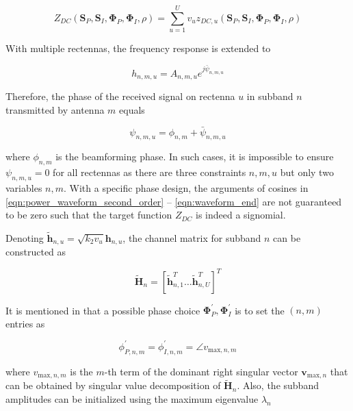 \begin{equation}\label{eqn:weighted_target}
  {Z_{DC}}\left( {{{\mathbf{S}}_P},{{\mathbf{S}}_I},{{\mathbf{\Phi }}_P},{{\mathbf{\Phi }}_I},\rho } \right) = \sum\limits_{u = 1}^U {{v_u}{z_{DC,u}}\left( {{{\mathbf{S}}_P},{{\mathbf{S}}_I},{{\mathbf{\Phi }}_P},{{\mathbf{\Phi }}_I},\rho } \right)}
\end{equation}

With multiple rectennas, the frequency response is extended to

\begin{equation}\label{eqn:mo_channel}
  {h_{n,m,u}} = {A_{n,m,u}}{e^{j{{\bar \psi }_{n,m,u}}}}
\end{equation}

Therefore, the phase of the received signal on rectenna $u$ in subband $n$ transmitted by antenna $m$ equals

\begin{equation}\label{eqn:received_phase}
  {\psi _{n,m,u}} = {\phi _{n,m}} + {{\bar \psi }_{n,m,u}}
\end{equation}

where ${\phi _{n,m}}$ is the beamforming phase. In such cases, it is impossible to ensure ${\psi _{n,m,u}} = 0$ for all rectennas as there are three constraints $n,m,u$ but only two variables $n,m$. With a specific phase design, the arguments of cosines in \eqref{eqn:power_waveform_second_order} -- \eqref{eqn:waveform_end} are not guaranteed to be zero such that the target function ${Z_{DC}}$ is indeed a signomial.

Denoting ${\widetilde {\mathbf{h}}_{n,u}} = \sqrt {{k_2}{v_u}} {{\mathbf{h}}_{n,u}}$, the channel matrix for subband $n$ can be constructed as

\begin{equation}\label{eqn:mo_channel_matrox}
  {\widetilde {\mathbf{H}}_n} = {\left[ {\widetilde {\mathbf{h}}_{n,1}^T \ldots \widetilde {\mathbf{h}}_{n,U}^T} \right]^T}
\end{equation}

It is mentioned in \cite{Clerckx2016} that a possible phase choice ${\mathbf{\Phi }}_P^\prime ,{\mathbf{\Phi }}_I^\prime $ is to set the $\left( {n,m} \right)$ entries as

\begin{equation}\label{eqn:mo_phases}
  \phi _{P,n,m}^\prime  = \phi _{I,n,m}^\prime  = \angle {v_{{\text{max}},n,m}}
\end{equation}

where ${v_{{\text{max}},n,m}}$ is the $m$-th term of the dominant right singular vector ${{\mathbf{v}}_{{\text{max}},n}}$ that can be obtained by singular value decomposition of ${\widetilde {\mathbf{H}}_n}$. Also, the subband amplitudes can be initialized using the maximum eigenvalue ${\lambda _n}$

